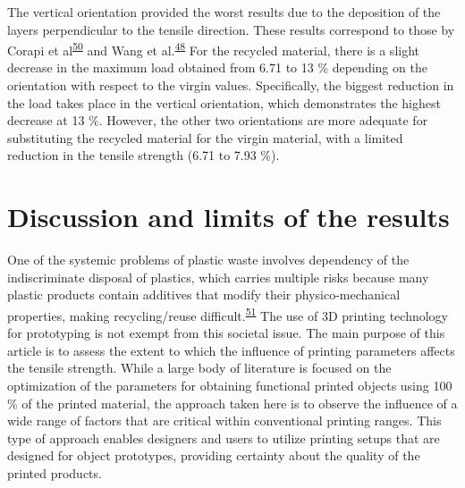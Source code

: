 \documentclass[
  12pt]{article}
\begin{document}
The vertical orientation provided the worst results due to the deposition of the layers perpendicular to the tensile direction.
These results correspond to those by Corapi et al\textsuperscript{\protect\hyperlink{ref-Corapi2019}{50}} and Wang et al.\textsuperscript{\protect\hyperlink{ref-Wang2020h}{48}}
For the recycled material, there is a slight decrease in the maximum load obtained from 6.71 to 13 \% depending on the orientation with respect to the virgin values. Specifically, the biggest reduction in the load takes place in the vertical orientation, which demonstrates the highest decrease at 13 \%.
However, the other two orientations are more adequate for substituting the recycled material for the virgin material, with a limited reduction in the tensile strength (6.71 to 7.93 \%).

\hypertarget{section:discussion}{%
\section{Discussion and limits of the results}\label{section:discussion}}

One of the systemic problems of plastic waste involves dependency of the indiscriminate disposal of plastics, which carries multiple risks because many plastic products contain additives that modify their physico-mechanical properties, making recycling/reuse difficult.\textsuperscript{\protect\hyperlink{ref-Wagner2020}{51}}
The use of 3D printing technology for prototyping is not exempt from this societal issue. The main purpose of this article is to assess the extent to which the influence of printing parameters affects the tensile strength.
While a large body of literature is focused on the optimization of the parameters for obtaining functional printed objects using 100 \% of the printed material, the approach taken here is to observe the influence of a wide range of factors that are critical within conventional printing ranges.
This type of approach enables designers and users to utilize printing setups that are designed for object prototypes, providing certainty about the quality of the printed products.
\end{document}
